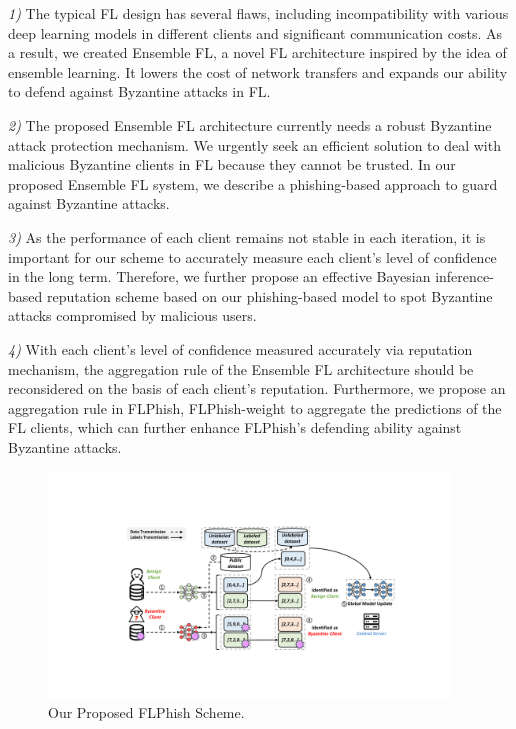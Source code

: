 \documentclass[journal]{IEEEtran}
\begin{document}
\par \textit{1)} The typical FL design has several flaws, including incompatibility with various deep learning models in different clients and significant communication costs. As a result, we created Ensemble FL, a novel FL architecture inspired by the idea of ensemble learning. It lowers the cost of network transfers and expands our ability to defend against Byzantine attacks in FL.
\par \textit{2)} The proposed Ensemble FL architecture currently needs a robust Byzantine attack protection mechanism. We urgently seek an efficient solution to deal with malicious Byzantine clients in FL because they cannot be trusted. In our proposed Ensemble FL system, we describe a phishing-based approach to guard against Byzantine attacks.
\par \textit{3)} As the performance of each client remains not stable in each iteration, it is important for our scheme to accurately measure each client's level of confidence in the long term. Therefore, we further propose an effective Bayesian inference-based reputation scheme based on our phishing-based model to spot Byzantine attacks compromised by malicious users.
\par \textit{4)} With each client's level of confidence measured accurately via reputation mechanism, the aggregation rule of the Ensemble FL architecture should be reconsidered on the basis of each client's reputation. Furthermore, we propose an aggregation rule in FLPhish, FLPhish-weight to aggregate the predictions of the FL clients, which can further enhance FLPhish's defending ability against Byzantine attacks.


  \begin{figure}
    \centering
  \includegraphics[width=0.95\textwidth]{figures/Figure_FLPhish.pdf}
  \caption{Our Proposed FLPhish Scheme.}
  \label{fig_Phishing}
  \end{figure}   
  
\end{document}
